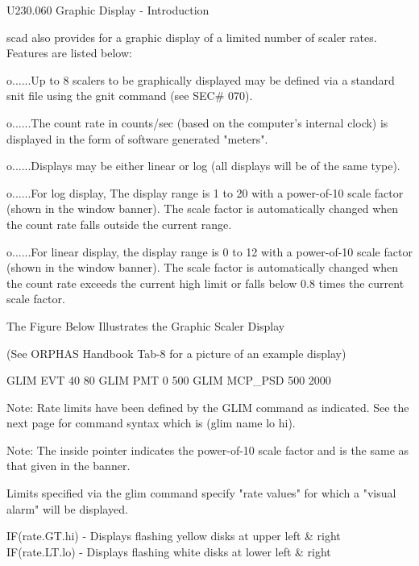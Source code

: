  
   U230.060  Graphic Display - Introduction
 
   scad also provides for a graphic display of  a  limited  number  of  scaler
   rates. Features are listed below:
 
   o......Up  to  8  scalers  to be graphically displayed may be defined via a
          standard snit file using the gnit command (see SEC# 070).
 
   o......The count rate in  counts/sec  (based  on  the  computer's  internal
          clock) is displayed in the form of software generated "meters".
 
   o......Displays  may  be  either linear or log (all displays will be of the
          same type).
 
   o......For log display, The display range is 1 to  20  with  a  power-of-10
          scale  factor  (shown  in  the  window  banner). The scale factor is
          automatically changed when the count rate falls outside the  current
          range.
 
   o......For  linear display, the display range is 0 to 12 with a power-of-10
          scale factor (shown in the  window  banner).  The  scale  factor  is
          automatically  changed  when the count rate exceeds the current high
          limit or falls below 0.8 times the current scale factor.
 
             The Figure Below Illustrates the Graphic Scaler Display
 
 
 
 
 
 
 
 
         (See ORPHAS Handbook Tab-8 for a picture of an example display)
 
 
 
 
 
 
 
 
      GLIM EVT 40  80         GLIM PMT 0  500          GLIM MCP_PSD 500 2000
 
   Note: Rate limits have been defined by the GLIM command as  indicated.  See
   the next page for command syntax which is (glim name lo hi).
 
   Note:  The inside pointer indicates the power-of-10 scale factor and is the
   same as that given in the banner.
 
   Limits specified via the glim command specify "rate  values"  for  which  a
   "visual alarm" will be displayed.
 
   IF(rate.GT.hi) - Displays flashing yellow disks at upper left & right
   IF(rate.LT.lo) - Displays flashing white  disks at lower left & right
 
